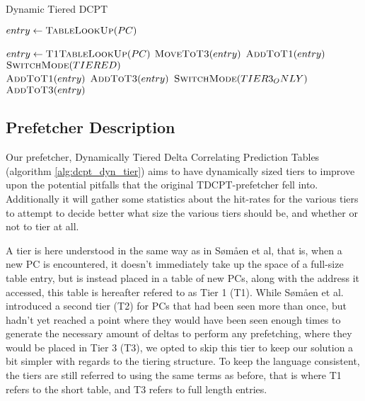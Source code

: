 \begin{algorithm}
\footnotesize
\caption{Dynamic Tiered DCPT}
  \begin{algorithmic}[1]
      \State $entry \gets \Call{TableLookUp}{PC}$

          \State $entry \gets \Call{T1TableLookUp}{PC}$
            \State $\Call{MoveToT3}{entry}$
          \Else
	    \State $\Call{AddToT1}{entry}$ 
          \EndIf
        \Else
            \State $\Call{SwitchMode}{TIERED}$ \\
	    \State $\Call{AddToT1}{entry}$
          \Else
	    \State $\Call{AddToT3}{entry}$
          \EndIf
        \EndIf
	  \State $\Call{SwitchMode}{TIER3_ONLY}$
	\EndIf
	\State $\Call{AddToT3}{entry}$
      \EndIf
    \EndProcedure
  \end{algorithmic}
  \label{alg:dcpt_dyn_tier}
\end{algorithm}


\subsection{Prefetcher Description}

Our prefetcher, Dynamically Tiered Delta Correlating Prediction
Tables (algorithm \ref{alg:dcpt_dyn_tier}) aims to have dynamically sized tiers to improve upon the potential
pitfalls that the original TDCPT-prefetcher fell into. Additionally it will
gather some statistics about the hit-rates for the various tiers to attempt to
decide better what size the various tiers should be, and whether or not to tier
at all.

A tier is here understood in the same way as in Sømåen et al, that is, when a
new PC is encountered, it doesn't immediately take up the space of a full-size
table entry, but is instead placed in a table of new PCs, along with the
address it accessed, this table is hereafter refered to as Tier 1 (T1). While
Sømåen et al. introduced a second tier (T2) for PCs that had been seen more
than once, but hadn't yet reached a point where they would have been seen
enough times to generate the necessary amount of deltas to perform any
prefetching, where they would be placed in Tier 3 (T3), we opted to skip this
tier to keep our solution a bit simpler with regards to the tiering structure.
To keep the language consistent, the tiers are still referred to using the
same terms as before, that is where T1 refers to the short table, and T3
refers to full length entries.


